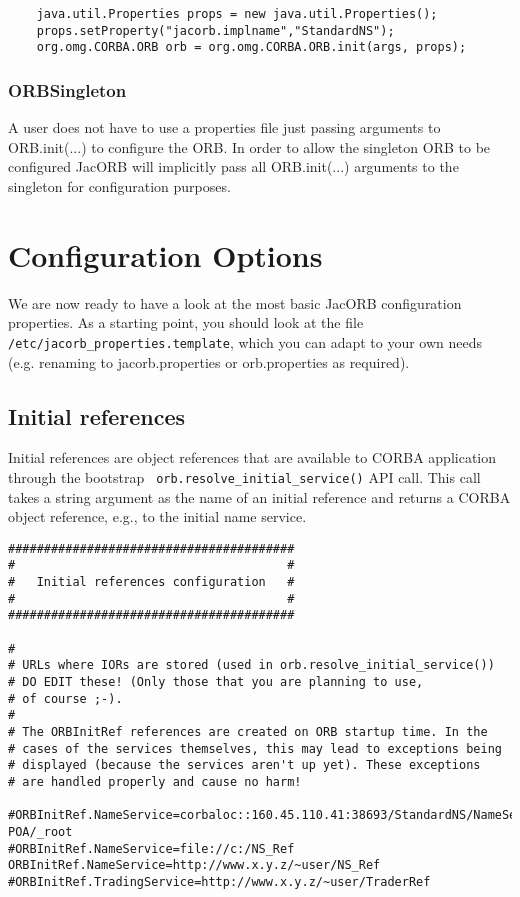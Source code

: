 \small{
\begin{verbatim}
    java.util.Properties props = new java.util.Properties();
    props.setProperty("jacorb.implname","StandardNS");
    org.omg.CORBA.ORB orb = org.omg.CORBA.ORB.init(args, props);
\end{verbatim}
}

\subsubsection{ORBSingleton}
A user does not have to use a properties file just passing arguments to ORB.init(...)
to configure the ORB. In order to allow the singleton ORB to be configured JacORB will
implicitly pass all ORB.init(...) arguments to the singleton for configuration purposes.

\section{Configuration Options}

We are now ready to have a look at the most basic JacORB configuration
properties. As a starting point, you should look at the file {\tt
  /etc/jacorb\_properties.template}, which you can adapt to your own
needs (e.g. renaming to jacorb.properties or orb.properties as required).

\subsection{Initial references}

Initial references are object references that are available to CORBA
application through the bootstrap {\tt
  orb.resolve\_initial\_service()} API call. This call takes a string
argument as the name of an initial reference and returns a CORBA
object reference, e.g., to the initial name service.

\renewcommand{\baselinestretch}{0.9}
\small{
\begin{verbatim}
########################################
#                                      #
#   Initial references configuration   #
#                                      #
########################################

#
# URLs where IORs are stored (used in orb.resolve_initial_service())
# DO EDIT these! (Only those that you are planning to use,
# of course ;-).
#
# The ORBInitRef references are created on ORB startup time. In the
# cases of the services themselves, this may lead to exceptions being
# displayed (because the services aren't up yet). These exceptions
# are handled properly and cause no harm!

#ORBInitRef.NameService=corbaloc::160.45.110.41:38693/StandardNS/NameServer-POA/_root
#ORBInitRef.NameService=file://c:/NS_Ref
ORBInitRef.NameService=http://www.x.y.z/~user/NS_Ref
#ORBInitRef.TradingService=http://www.x.y.z/~user/TraderRef
\end{verbatim}
}
\renewcommand{\baselinestretch}{1.0}
\small\normalsize

